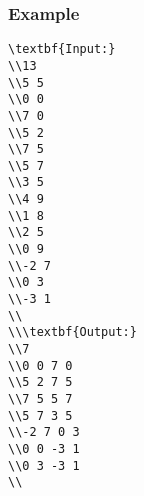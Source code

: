 \subsubsection{   Example  }
\begin{verbatim}
\textbf{Input:}
\\13
\\5 5
\\0 0
\\7 0
\\5 2
\\7 5
\\5 7
\\3 5
\\4 9
\\1 8
\\2 5
\\0 9
\\-2 7
\\0 3
\\-3 1
\\
\\\textbf{Output:}
\\7
\\0 0 7 0
\\5 2 7 5
\\7 5 5 7
\\5 7 3 5
\\-2 7 0 3
\\0 0 -3 1
\\0 3 -3 1
\\\end{verbatim}
